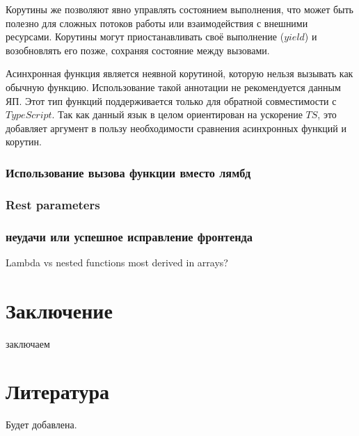 \documentclass{mipt-thesis-bs}
\begin{document}
Корутины же позволяют явно управлять состоянием выполнения, что может
быть полезно для сложных потоков работы или взаимодействия
с внешними ресурсами. Корутины могут приостанавливать своё
выполнение ($yield$) и возобновлять его позже, сохраняя
состояние между вызовами.

Асинхронная функция является неявной корутиной, которую нельзя
вызывать как обычную функцию. Использование такой аннотации
не рекомендуется данным ЯП. Этот тип функций поддерживается
только для обратной совместимости с $TypeScript$.
Так как данный язык в целом ориентирован на ускорение $TS$, это
добавляет аргумент в пользу необходимости сравнения асинхронных
функций и корутин.

\subsection{Использование вызова функции вместо лямбд}


\subsection{Rest parameters}

\subsection {неудачи или успешное исправление фронтенда}
Lambda vs nested functions
most derived in arrays?

\chapter{Заключение}
заключаем

\backmatter


\chapter{Литература}

Будет добавлена.
\end{document}
